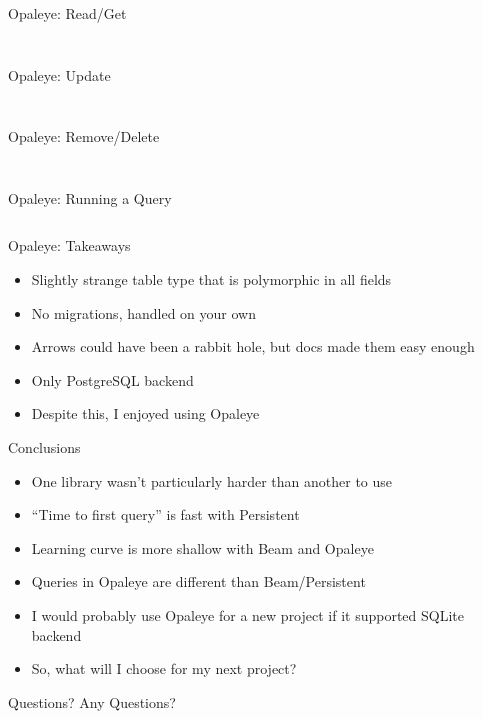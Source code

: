 \documentclass[hyperref={pdfpagelabels=false},12pt]{beamer}
\newcommand{\pygment}[3]{
  \inputminted[frame=single,framesep=2mm,linenos,fontsize=#1]{#2}{#3}
}
\newcommand{\pygmentLines}[5]{
  \inputminted[frame=single,framesep=2mm,linenos,fontsize=#1,firstline=#2,lastline=#3,autogobble]{#4}{#5}
}
\begin{document}
\begin{frame}{Opaleye: Read/Get}
  \pygmentLines{\scriptsize}{127}{133}{haskell}{code/opaleye-example/src/Person.hs}
  \pygment{\scriptsize}{sql}{code/sql/selectWhere.sql}
\end{frame}

\begin{frame}{Opaleye: Update}
  \pygmentLines{\scriptsize}{113}{125}{haskell}{code/opaleye-example/src/Person.hs}
  \pygment{\scriptsize}{sql}{code/sql/updateSetWhere.sql}
\end{frame}

\begin{frame}{Opaleye: Remove/Delete}
  \pygmentLines{\scriptsize}{89}{96}{haskell}{code/opaleye-example/src/Person.hs}
  \pygment{\scriptsize}{sql}{code/sql/deleteWhere.sql}
\end{frame}

\begin{frame}{Opaleye: Running a Query}
  \pygmentLines{\scriptsize}{26}{37}{haskell}{code/opaleye-example/test/Spec.hs}
\end{frame}

\begin{frame}{Opaleye: Takeaways}
  \begin{itemize}
    \item Slightly strange table type that is polymorphic in all fields
    \item No migrations, handled on your own
    \item Arrows could have been a rabbit hole, but docs made them easy enough
    \item Only PostgreSQL backend
    \item Despite this, I enjoyed using Opaleye
  \end{itemize}
\end{frame}

\begin{frame}{Conclusions}
  \begin{itemize}
    \item One library wasn't particularly harder than another to use
    \item ``Time to first query'' is fast with Persistent
    \item Learning curve is more shallow with Beam and Opaleye
    \item Queries in Opaleye are different than Beam/Persistent
    \item I would probably use Opaleye for a new project if it supported SQLite
      backend
    \item So, what will I choose for my next project?
  \end{itemize}
\end{frame}

\begin{frame}{Questions?}
  \centering \Huge Any Questions?
\end{frame}
\end{document}

